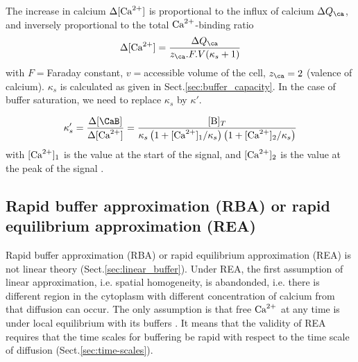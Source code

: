 The increase in calcium $\Delta [{\text{Ca}^{2+}}]$ is proportional to the influx of calcium
$\Delta Q_\ca$, and inversely proportional to the total ${\text{Ca}^{2+}}$-binding ratio
\begin{equation}
\Delta [\Ca] = \frac{\Delta Q_\ca}{z_\ca.F.V (\kappa_s+1)}
\end{equation}
with $F=$Faraday constant, $v=$accessible volume of the cell, $z_\ca=2$
(valence of calcium). $\kappa_s$ is calculated as given in
Sect.\ref{sec:buffer_capacity}. In the case of buffer saturation, we need to
replace $\kappa_s$ by $\kappa'$.

\begin{equation}
\kappa'_s = \frac{\Delta [\CaB]}{\Delta [\Ca]} = \frac{[\B]_T}{\kappa_s
\left(1 + [\Ca]_1/\kappa_s\right) \left(1+ [\Ca]_2/\kappa_s\right)}
\end{equation}
with $[{\text{Ca}^{2+}}]_1$ is the value at the start of the signal, and $[{\text{Ca}^{2+}}]_2$ is the
value at the peak of the signal \citep{zhou1993}.




\subsection{Rapid buffer approximation (RBA) or rapid equilibrium approximation
(REA)}
\label{sec:rapid_buffer}

Rapid buffer approximation (RBA) or rapid equilibrium approximation (REA) is not
linear theory (Sect.\ref{sec:linear_buffer}). Under REA, the first assumption of
linear approximation, i.e. spatial homogeneity, is abandonded, i.e. there is
different region in the cytoplasm with different concentration of calcium from
that diffusion can occur.
The only assumption is that free ${\text{Ca}^{2+}}$ at any time is under local equilibrium
with its buffers \citep{wagner1994erb}.
It means that the validity of REA requires that the time scales for buffering be
rapid with respect to the time scale of diffusion (Sect.\ref{sec:time-scales}).

